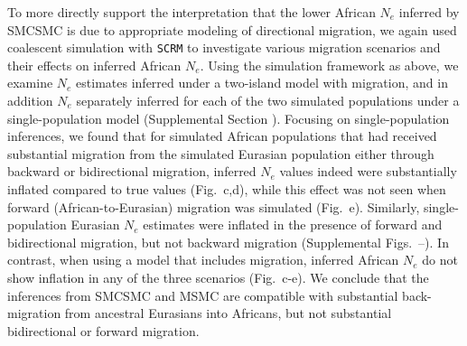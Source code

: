 \begin{figure}
	\label{fig:neplot}
\end{figure}

To more directly support the interpretation that the lower African $N_e$ inferred by SMCSMC is due to appropriate modeling of directional migration, we again used coalescent simulation with {\tt SCRM} to investigate various migration scenarios and their effects on inferred African $N_e$. Using the simulation framework as above, we examine $N_e$ estimates inferred under a two-island model with migration, and in addition $N_e$ separately inferred for each of the two simulated populations under a single-population model (Supplemental Section ).  Focusing on single-population inferences, we found that for simulated African populations that had received substantial migration from the simulated Eurasian population either through backward or bidirectional migration, inferred $N_e$ values indeed were substantially inflated compared to true values (Fig.\ c,d), while this effect was not seen when forward (African-to-Eurasian) migration was simulated (Fig.\ e).  
Similarly, single-population Eurasian $N_e$ estimates were inflated in the presence of forward and bidirectional migration, but not backward migration (Supplemental Figs.\ --).
In contrast, when using a model that includes migration, inferred African $N_e$ do not show inflation in any of the three scenarios (Fig.\ c-e). We conclude that the inferences from SMCSMC and MSMC are compatible with substantial back-migration from ancestral Eurasians into Africans, but not substantial bidirectional or forward migration.

